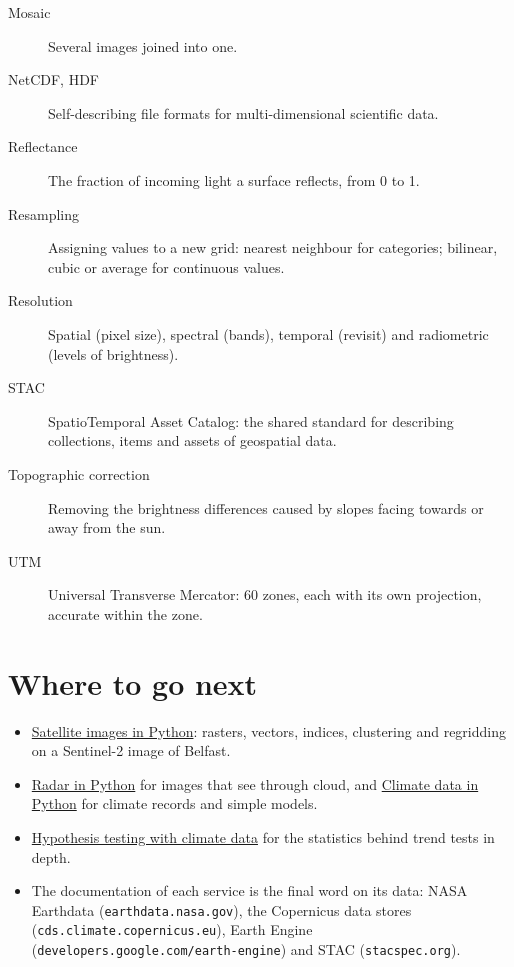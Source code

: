 \begin{description}
\item[Mosaic] Several images joined into one.
\item[NetCDF, HDF] Self-describing file formats for multi-dimensional scientific data.
\item[Reflectance] The fraction of incoming light a surface reflects, from 0 to 1.
\item[Resampling] Assigning values to a new grid: nearest neighbour for categories; bilinear, cubic or average for continuous values.
\item[Resolution] Spatial (pixel size), spectral (bands), temporal (revisit) and radiometric (levels of brightness).
\item[STAC] SpatioTemporal Asset Catalog: the shared standard for describing collections, items and assets of geospatial data.
\item[Topographic correction] Removing the brightness differences caused by slopes facing towards or away from the sun.
\item[UTM] Universal Transverse Mercator: 60 zones, each with its own projection, accurate within the zone.
\end{description}

\section{Where to go next}
\begin{itemize}
\item \href{https://ahmadammar.github.io/teaching/satellite-python/}{Satellite images in Python}: rasters, vectors, indices, clustering and regridding on a Sentinel-2 image of Belfast.
\item \href{https://ahmadammar.github.io/teaching/radar-python/}{Radar in Python} for images that see through cloud, and \href{https://ahmadammar.github.io/teaching/climate-data-python/}{Climate data in Python} for climate records and simple models.
\item \href{https://ahmadammar.github.io/teaching/hypothesis-testing/}{Hypothesis testing with climate data} for the statistics behind trend tests in depth.
\item The documentation of each service is the final word on its data: NASA Earthdata (\texttt{earthdata.nasa.gov}), the Copernicus data stores (\texttt{cds.climate.copernicus.eu}), Earth Engine (\texttt{developers.google.com/earth-engine}) and STAC (\texttt{stacspec.org}).
\end{itemize}

